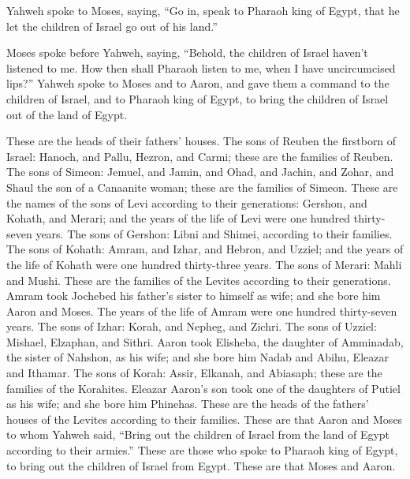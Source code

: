  Yahweh spoke to Moses, saying,  ``Go in,
speak to Pharaoh king of Egypt, that he let the children of Israel go
out of his land.''

 Moses spoke before Yahweh, saying, ``Behold, the
children of Israel haven't listened to me. How then shall Pharaoh listen
to me, when I have uncircumcised lips?''  Yahweh spoke to
Moses and to Aaron, and gave them a command to the children of Israel,
and to Pharaoh king of Egypt, to bring the children of Israel out of the
land of Egypt.

 These are the heads of their fathers' houses. The sons
of Reuben the firstborn of Israel: Hanoch, and Pallu, Hezron, and Carmi;
these are the families of Reuben.  The sons of Simeon:
Jemuel, and Jamin, and Ohad, and Jachin, and Zohar, and Shaul the son of
a Canaanite woman; these are the families of Simeon. 
These are the names of the sons of Levi according to their generations:
Gershon, and Kohath, and Merari; and the years of the life of Levi were
one hundred thirty-seven years.  The sons of Gershon:
Libni and Shimei, according to their families.  The sons
of Kohath: Amram, and Izhar, and Hebron, and Uzziel; and the years of
the life of Kohath were one hundred thirty-three years. 
The sons of Merari: Mahli and Mushi. These are the families of the
Levites according to their generations.  Amram took
Jochebed his father's sister to himself as wife; and she bore him Aaron
and Moses. The years of the life of Amram were one hundred thirty-seven
years.  The sons of Izhar: Korah, and Nepheg, and Zichri.
 The sons of Uzziel: Mishael, Elzaphan, and Sithri.
 Aaron took Elisheba, the daughter of Amminadab, the
sister of Nahshon, as his wife; and she bore him Nadab and Abihu,
Eleazar and Ithamar.  The sons of Korah: Assir, Elkanah,
and Abiasaph; these are the families of the Korahites. 
Eleazar Aaron's son took one of the daughters of Putiel as his wife; and
she bore him Phinehas. These are the heads of the fathers' houses of the
Levites according to their families.  These are that
Aaron and Moses to whom Yahweh said, ``Bring out the children of Israel
from the land of Egypt according to their armies.'' 
These are those who spoke to Pharaoh king of Egypt, to bring out the
children of Israel from Egypt. These are that Moses and Aaron.

